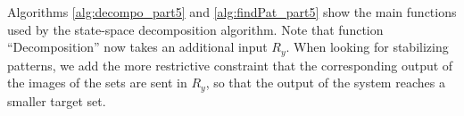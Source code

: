 % 
% 
Algorithms \ref{alg:decompo_part5} and \ref{alg:findPat_part5} show the main functions
used by the state-space decomposition algorithm.
Note that function ``Decomposition'' now takes an additional input $R_y$. 
When looking for stabilizing patterns, 
we add the more restrictive constraint
that the corresponding output of the images of the sets are sent in $R_y$, 
so that the output of the system reaches a smaller target set. 
 

